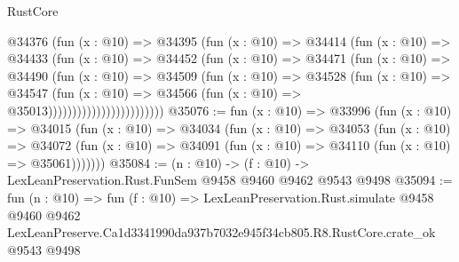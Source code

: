 \begin{lexlean}{RustCore}
\begin{coremodule}
                            @34376
                              (fun (x : @10) =>
                              @34395
                                (fun (x : @10) =>
                                @34414
                                  (fun (x : @10) =>
                                  @34433
                                    (fun (x : @10) =>
                                    @34452
                                      (fun (x : @10) =>
                                      @34471
                                        (fun (x : @10) =>
                                        @34490
                                          (fun (x : @10) =>
                                          @34509
                                            (fun (x : @10) =>
                                            @34528
                                              (fun (x : @10) =>
                                              @34547
                                                (fun (x : @10) =>
                                                @34566
                                                  (fun (x : @10) => @35013))))))))))))))))))))))))
@35076 := fun (x : @10) =>
  @33996
    (fun (x : @10) =>
    @34015
      (fun (x : @10) =>
      @34034
        (fun (x : @10) =>
        @34053
          (fun (x : @10) =>
          @34072 (fun (x : @10) => @34091 (fun (x : @10) => @34110 (fun (x : @10) => @35061)))))))
@35084 := (n : @10) -> (f : @10) -> LexLeanPreservation.Rust.FunSem @9458 @9460 @9462 @9543 @9498
@35094 := fun (n : @10) =>
  fun (f : @10) =>
  LexLeanPreservation.Rust.simulate
    @9458
    @9460
    @9462
    LexLeanPreserve.Ca1d3341990da937b7032e945f34cb805.R8.RustCore.crate_ok
    @9543
    @9498
\end{coremodule}
\end{lexlean}
